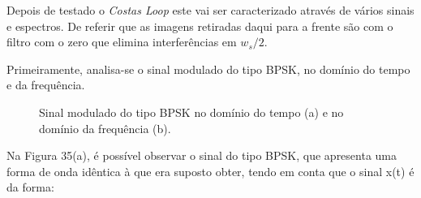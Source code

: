 \documentclass[11pt]{article}
\numberwithin{equation}{section}
\begin{document}
Depois de testado o \textit{Costas Loop} este vai ser caracterizado através de vários sinais e espectros. De referir que as imagens retiradas daqui para a frente são com o filtro com o zero que elimina interferências em $w_{s}/2$. 

Primeiramente, analisa-se o sinal modulado do tipo BPSK, no domínio do tempo e da frequência.

\begin{figure}[H]
	\centering
	\hspace{8mm}
	\vspace{-0.8em}
	\caption{Sinal modulado do tipo BPSK no domínio do tempo (a) e no domínio da frequência (b).}
	\vspace{-0.8em}
\end{figure}

Na Figura 35(a), é possível observar o sinal do tipo BPSK, que apresenta uma forma de onda idêntica à que era suposto obter, tendo em conta que o sinal x(t) é da forma:
\end{document}
